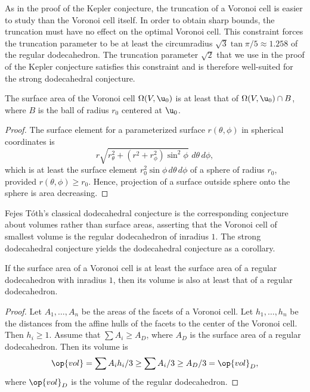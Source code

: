 \begin{remark}
As in the proof of the Kepler conjecture, the truncation of a Voronoi cell is easier
to study than the Voronoi cell itself.  In order to obtain sharp bounds, the truncation
must have no effect on the optimal Voronoi cell.  This constraint forces the
 truncation parameter to be at least
the circumradius $\sqrt{3}\tan{\pi/5}\approx 1.258$ of the regular dodecahedron.   The truncation parameter $\sqrt{2}$
that we use in the proof of the Kepler conjecture satisfies this constraint and is
therefore  well-suited for the strong dodecahedral
conjecture.
\end{remark}

\begin{lemma}[]  %
  The surface area of the Voronoi cell $\Omega(V, \u_0)$ is at least
  that of $\Omega(V, \u_0)\cap B$, where $B$ is the ball of radius
  $r_0$ centered at $ \u_0$.  
\end{lemma}
%
%

\begin{proof} The surface element for a parameterized surface
  $r(\theta,\phi)$ in spherical coordinates is
\[
%
  r \sqrt{r_\theta^2 + (r^2 + r_\phi^2)\sin^2\phi } \,\,d\theta\,d\phi,
\]
which is at least the surface element $r_0^2 \sin\phi\, d\theta\,d\phi$
of a sphere of radius $r_0$, provided
$r(\theta,\phi)\ge r_0$.   Hence, projection of a surface outside
sphere onto the sphere is area decreasing.
\end{proof}


Fejes T\'oth's classical dodecahedral conjecture is the corresponding conjecture
about volumes rather than surface areas, asserting that  the
Voronoi cell of smallest volume is the regular dodecahedron of
inradius $1$.  %
%
The strong dodecahedral conjecture yields the dodecahedral conjecture
as a corollary.

\begin{lemma}[]
  If the surface area of a Voronoi cell is at least the surface area
  of a regular dodecahedron with inradius $1$, then its volume is also
   at least that  of a regular dodecahedron.
\end{lemma}

\begin{proof} Let $A_1,\ldots,A_n$ be the areas of the facets of a
  Voronoi cell.  Let $h_1,\ldots,h_n$ be the distances from the affine
  hulls of the facets to the center of the Voronoi cell.  Then $h_i\ge
  1$.  Assume that $\sum A_i \ge A_D$, where $A_D$ is the surface area
  of a regular dodecahedron.  Then its volume is
\[
\op{vol} = \sum A_i h_i/3 \ge \sum A_i/3 \ge A_D/3 = \op{vol}_D,
\]
where $\op{vol}_D$ is the volume of the regular dodecahedron.
\end{proof}
%
%
%


